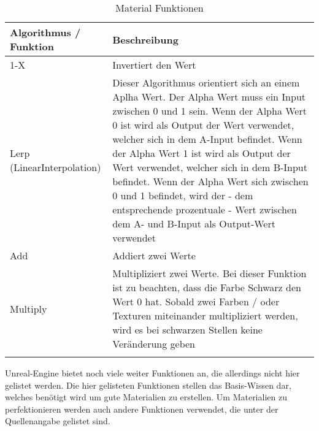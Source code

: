 \begin{longtable}{|p{4cm}|p{9.6cm}|}
    \hline
    \endfirsthead
    \textbf{Algorithmus / Funktion} & \textbf{Beschreibung}\\
    \hline
    \endhead

    1-X & Invertiert den Wert \\
    \hline

    Lerp (LinearInterpolation) & Dieser Algorithmus orientiert sich an einem Aplha Wert. Der Alpha Wert muss ein
    Input zwischen 0 und 1 sein. Wenn der Alpha Wert 0 ist wird als Output der Wert
    verwendet, welcher sich in dem A-Input befindet. Wenn der Alpha Wert 1 ist wird
    als Output der Wert verwendet, welcher sich in dem B-Input befindet. Wenn der
    Alpha Wert sich zwischen 0 und 1 befindet, wird der - dem entsprechende prozentuale -
    Wert zwischen dem A- und B-Input als Output-Wert verwendet \\
    \hline

    Add & Addiert zwei Werte \\
    \hline

    Multiply & Multipliziert zwei Werte. Bei dieser Funktion ist zu beachten, dass die Farbe Schwarz
    den Wert 0 hat. Sobald zwei Farben / oder Texturen miteinander multipliziert
    werden, wird es bei schwarzen Stellen keine Veränderung geben \\
    \hline

    \caption{Material Funktionen}
    \label{table:mat_algorithms}
\end{longtable}

Unreal-Engine bietet noch viele weiter Funktionen an, die allerdings nicht hier gelistet werden. Die hier gelisteten
Funktionen stellen das Basis-Wissen dar, welches benötigt wird um gute Materialien zu erstellen.
Um Materialien zu perfektionieren werden auch andere Funktionen verwendet, die unter der Quellenangabe gelistet
sind\citep{ue:mat_algorithms}.
